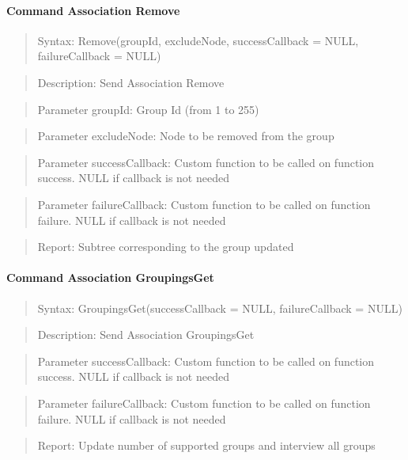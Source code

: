 \paragraph{Command Association Remove}
\begin{quote}Syntax: Remove(groupId, excludeNode, successCallback = NULL, failureCallback = NULL)\end{quote}
\begin{quote}Description: Send Association Remove\end{quote}
\begin{quote}Parameter groupId: Group Id (from 1 to 255)\end{quote}
\begin{quote}Parameter excludeNode: Node to be removed from the group\end{quote}
\begin{quote}Parameter successCallback: Custom function to be called on function success. NULL if callback is not needed\end{quote}
\begin{quote}Parameter failureCallback: Custom function to be called on function failure. NULL if callback is not needed\end{quote}
\begin{quote}Report: Subtree corresponding to the group updated\end{quote}

\paragraph{Command Association GroupingsGet}
\begin{quote}Syntax: GroupingsGet(successCallback = NULL, failureCallback = NULL)\end{quote}
\begin{quote}Description: Send Association GroupingsGet\end{quote}
\begin{quote}Parameter successCallback: Custom function to be called on function success. NULL if callback is not needed\end{quote}
\begin{quote}Parameter failureCallback: Custom function to be called on function failure. NULL if callback is not needed\end{quote}
\begin{quote}Report: Update number of supported groups and interview all groups\end{quote}


